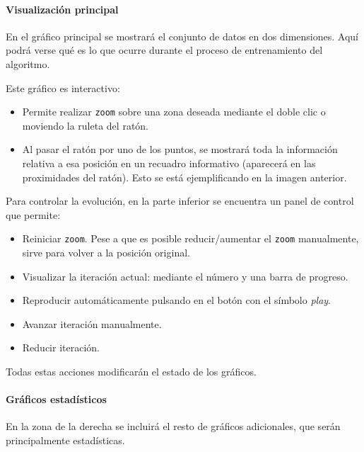 
\paragraph{Visualización principal} En el gráfico principal se mostrará el
conjunto de datos en dos dimensiones. Aquí podrá verse qué es lo que ocurre
durante el proceso de entrenamiento del algoritmo.


Este gráfico es interactivo:
\begin{itemize}
    \item Permite realizar \texttt{zoom} sobre una zona deseada mediante el
    doble clic o moviendo la ruleta del ratón.
    \item Al pasar el ratón por uno de los puntos, se mostrará toda la
    información relativa a esa posición en un recuadro informativo (aparecerá en
    las proximidades del ratón). Esto se está ejemplificando en la imagen
    anterior.
\end{itemize}

Para controlar la evolución, en la parte inferior se encuentra un panel de
control que permite:
\begin{itemize}
    \item Reiniciar \texttt{zoom}. Pese a que es posible reducir/aumentar el
    \texttt{zoom} manualmente, sirve para volver a la posición original.
    \item Visualizar la iteración actual: mediante el número y una barra de
    progreso.
    \item Reproducir automáticamente pulsando en el botón con el símbolo
    \textit{play}.
    \item Avanzar iteración manualmente.
    \item Reducir iteración.
\end{itemize}

Todas estas acciones modificarán el estado de los gráficos.

\paragraph{Gráficos estadísticos} En la zona de la derecha se incluirá el resto
de gráficos adicionales, que serán principalmente estadísticas.



